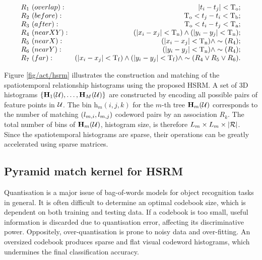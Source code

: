 \begin{equation}
	\centering 
	\begin{array}{lr}
		R_{1}~{(overlap)}: & |t_i - t_j| < \mathrm{T_{o}}; \\
		R_{2}~{(before)}: & \mathrm{T_{o}} < t_j - t_i < \mathrm{T_{b}}; \\
		R_{3}~{(after)}: & \mathrm{T_{o}} < t_i - t_j < \mathrm{T_{a}}; \\
		R_{4}~{(near XY)}: & (|x_i - x_j| < \mathrm{T_{n}}) \wedge (|y_i - y_j| < \mathrm{T_{n}}); \\
		R_{5}~{(near X)}: & (|x_i - x_j| < \mathrm{T_{n}}) \wedge \sim(R_{4}); \\
		R_{6}~{(near Y)}: & (|y_i - y_j| < \mathrm{T_{n}}) \wedge \sim(R_{4}); \\
		R_{7}~{(far)}: & (|x_i - x_j| < \mathrm{T_{f}}) \wedge (|y_i - y_j| < \mathrm{T_{f}}) \wedge \sim(R_{4} \vee R_{5} \vee R_{6}).
	\end{array}
\end{equation}

Figure \ref{fig/act/hsrm} illustrates the construction and matching of the spatiotemporal relationship histograms using the proposed HSRM. 
A set of 3D histograms $\{ \mathbf{H}_1(\mathcal{U}),\dots,\mathbf{H}_{M}(\mathcal{U})\}$ are constructed by encoding all possible pairs of feature points in $\mathcal{U}$. The bin $\mathrm{h}_{m}(i,j,k)$ for the $m$-th tree $\mathbf{H}_{m}(\mathcal{U})$ corresponds to the number of matching $(l_{m,i},l_{m,j})$ codeword pairs by an association $R_k$. The total number of bins of $\mathbf{H}_m(\mathcal{U})$, \ie histogram size, is therefore $L_m \times L_m \times |\mathcal{R}|$. Since the spatiotemporal histograms are sparse, their operations can be greatly accelerated using sparse matrices.  

\subsection{Pyramid match kernel for HSRM}
Quantisation is a major issue of bag-of-words models for object recognition tasks in general. It is often difficult to determine an optimal codebook size, which is dependent on both training and testing data. 
If a codebook is too small, useful information is discarded due to quantisation error, affecting its discriminative power. 
Oppositely, over-quantisation is prone to noisy data and over-fitting. An oversized codebook produces sparse and flat visual codeword histograms, which undermines the final classification accuracy.  

